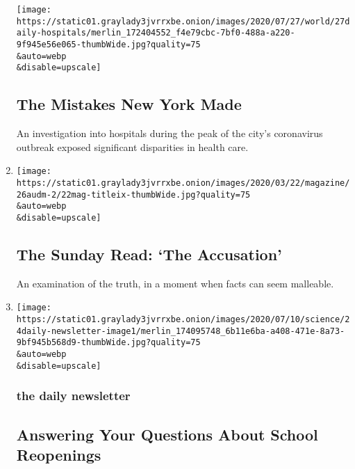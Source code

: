 \begin{enumerate}
  \texttt{[image: https://static01.graylady3jvrrxbe.onion/images/2020/07/27/world/27daily-hospitals/merlin\_172404552\_f4e79cbc-7bf0-488a-a220-9f945e56e065-thumbWide.jpg?quality=75\\\&auto=webp\\\&disable=upscale]}

  \hypertarget{the-mistakes-new-york-made}{%
  \subsection{The Mistakes New York
  Made}\label{the-mistakes-new-york-made}}

  An investigation into hospitals during the peak of the city's
  coronavirus outbreak exposed significant disparities in health care.
\item
  \href{/2020/07/26/podcasts/the-daily/the-accusation-the-sunday-read.html}{}

  \texttt{[image: https://static01.graylady3jvrrxbe.onion/images/2020/03/22/magazine/26audm-2/22mag-titleix-thumbWide.jpg?quality=75\\\&auto=webp\\\&disable=upscale]}

  \hypertarget{the-sunday-read-the-accusation}{%
  \subsection{The Sunday Read: `The
  Accusation'}\label{the-sunday-read-the-accusation}}

  An examination of the truth, in a moment when facts can seem
  malleable.
\item
  \href{/2020/07/24/podcasts/daily-newsletter-schools-reopening-summer-playlist.html}{}

  \texttt{[image: https://static01.graylady3jvrrxbe.onion/images/2020/07/10/science/24daily-newsletter-image1/merlin\_174095748\_6b11e6ba-a408-471e-8a73-9bf945b568d9-thumbWide.jpg?quality=75\\\&auto=webp\\\&disable=upscale]}

  \hypertarget{the-daily-newsletter-1}{%
  \subsubsection{the daily newsletter}\label{the-daily-newsletter-1}}

  \hypertarget{answering-your-questions-about-school-reopenings}{%
  \subsection{Answering Your Questions About School
  Reopenings}\label{answering-your-questions-about-school-reopenings}}


\end{enumerate}
